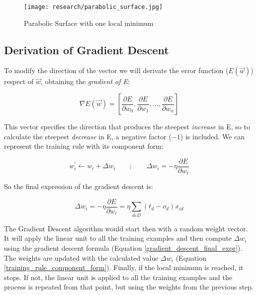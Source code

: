 	\begin{figure}[!ht]
		\centering
		\vspace{0.5cm}
		\texttt{[image: research/parabolic\_surface.jpg]}
		\caption{Parabolic Surface with one local minimum}
		\label{fig:parabolic_surf}
	\end{figure}

	\subsection{Derivation of Gradient Descent}
	To modify the direction of the vector we will derivate the error function ($E(\vec{w})$) respect of $\vec{w}$, obtaining the \textit{gradient of E}:

	\begin{equation}
		\label{gradient_of_E}
		\nabla E(\vec{w})= [\frac{\partial{E}}{\partial{w_{0}}}, \frac{\partial{E}}{\partial{w_{1}}}, ..., \frac{\partial{E}}{\partial{w_{n}}}]
	\end{equation}

	This vector specifies the direction that produces the steepest \textit{increase} in E, so to calculate the steepest \textit{decrease} in E, a negative factor ($-1$) is included. We can represent the training rule with its component form:

	\begin{equation}
		\label{training_rule_component_form}
		w_{i}^{'} \leftarrow w_{i} + \Delta w_{i} \qquad ; \qquad \Delta{w_{i}}=-\eta \frac{\partial{E}}{\partial{w_i}}
	\end{equation}

	So the final expression of the gradient descent is:

	\begin{equation}
		\label{gradient_descent_final_expr}
		\Delta w_i = -\eta \frac{\partial{E}}{\partial{w_i}} = \eta \sum_{d \varepsilon D} (t_d - o_d) x_{id}
	\end{equation}

	The Gradient Descent algorithm would start then with a random weight vector. It will apply the linear unit to all the training examples and then compute $\Delta w_i$ using the gradient descent formula (Equation \ref{gradient_descent_final_expr}). The weights are updated with the calculated value $\Delta{w_{i}}$ (Equation \ref{training_rule_component_form}). Finally, if the local minimum is reached, it stops. If not, the linear unit is applied to all the training examples and the process is repeated from that point, but using the weights from the previous step.

